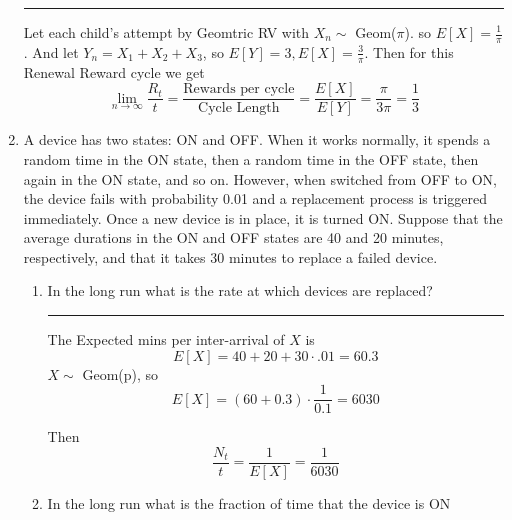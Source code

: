 \documentclass{article} %
\theoremstyle{plain}
\theoremstyle{case}
\begin{document}
\begin{enumerate}[label={\fbox{\textbf{Exercise \#\arabic* :}}}]
\par\noindent\rule{\textwidth}{0.1pt}
      Let each child's attempt by Geomtric RV with $X_n \sim $ Geom($\pi$).
    so $E[X] = \frac{1}{\pi}$.
    And let $Y_n = X_1 + X_2 + X_3$, so $E[Y] = 3, E[X] = \frac{3}{\pi}$. 
    Then for this Renewal Reward cycle we get
    \[ \lim_{n \to \infty} \frac{R_t}{t} =
        \frac{\text{Rewards per cycle}}{\text{Cycle Length}}
        = \frac{E[X]}{E[Y]}
        = \frac{\pi}{3 \pi} = \frac{1}{3}   \]
  \newpage
  \item A device has two states: ON and OFF. When it works normally, it
    spends a random time in the ON state, then a random time in the OFF
    state, then again in the ON state, and so on. However, when switched
    from OFF to ON, the device fails with probability 0.01 and a
    replacement process is triggered immediately. Once a new device is in
    place, it is turned ON. Suppose that the average durations in the ON
    and OFF states are 40 and 20 minutes, respectively, and that it takes
    30 minutes to replace a failed device.
    \begin{enumerate}
      \item In the long run what is the rate at which devices are replaced?
\par\noindent\rule{\textwidth}{0.1pt}
        The Expected mins per inter-arrival of $X$ is
        \[ E[X] = 40 + 20 + 30 \cdot .01 = 60.3 \]
        $X \sim$ Geom(p), so 
        \[ E[X] = (60 + 0.3) \cdot \frac{1}{0.1} = 6030 \]

        Then
        \[ \frac{N_t}{t} = \frac{1}{E[X]} =  \frac{1}{6030} \]
      \item In the long run what is the fraction of time that the device is ON


\end{enumerate}
\end{enumerate}
\end{document}
